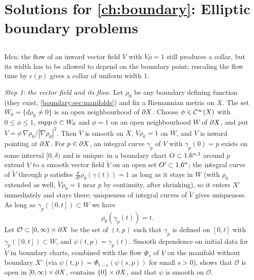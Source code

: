 \providecommand{\dCmI}{\dot{\mathcal{C}}^{-\infty}}
\providecommand{\Hdot}[1]{\dot{H}^{#1}}
\providecommand{\Xt}{\tilde{X}}
\providecommand{\PiC}{\Pi_{\mathcal{C}}}
\providecommand{\Cau}{\mathfrak{C}}

\section{Solutions for \cref{ch:boundary}: Elliptic boundary problems}\label{solutions:boundary}

\subsection*{}
Idea: the flow of an inward vector field $V$ with $V\rho=1$ still produces a collar, but
its width has to be allowed to depend on the boundary point; rescaling the flow time by
$\epsilon(p)$ gives a collar of uniform width $1$.

\emph{Step 1: the vector field and its flow.} Let $\rho_0$ be any boundary defining
function (they exist, \cref{boundary:sec:manifolds}) and fix a Riemannian metric on $X$.
The set $W_0=\{d\rho_0\neq0\}$ is an open neighbourhood of $\partial X$. Choose $\phi\in\mathcal{C}^\infty(X)$
with $0\le\phi\le1$, $\operatorname{supp}\phi\subset W_0$ and $\phi=1$ on an open neighbourhood $W$ of
$\partial X$, and put $V=\phi\,\nabla\rho_0/|\nabla\rho_0|^2$. Then $V$ is smooth on $X$,
$V\rho_0=1$ on $W$, and $V$ is inward pointing at $\partial X$. For $p\in\partial X$, an integral
curve $\gamma_p$ of $V$ with $\gamma_p(0)=p$ exists on some interval $[0,\delta)$ and is
unique: in a boundary chart $O\subset1.6^{n,1}$ around $p$ extend $V$ to a smooth vector
field $\tilde V$ on an open set $O'\subset1.6^n$; the integral curve of $\tilde V$ through
$p$ satisfies $\frac d{dt}\rho_0(\gamma(t))=1$ as long as it stays in $W$ (with $\rho_0$
extended as well, $\tilde V\tilde\rho_0=1$ near $p$ by continuity, after shrinking), so
it enters $X^\circ$ immediately and stays there; uniqueness of integral curves of
$\tilde V$ gives uniqueness. As long as $\gamma_p([0,t])\subset W$ we have
\begin{equation*}
\rho_0(\gamma_p(t))=t .
\end{equation*}
Let $\mathcal O\subset[0,\infty)\times\partial X$ be the set of $(t,p)$ such that $\gamma_p$
is defined on $[0,t]$ with $\gamma_p([0,t])\subset W$, and $\psi(t,p)=\gamma_p(t)$.
Smooth dependence on initial data for $\tilde V$ in boundary charts, combined with the
flow $\Phi_s$ of $V$ on the manifold without boundary $X^\circ$ (via
$\psi(t,p)=\Phi_{t-s}(\psi(s,p))$ for small $s>0$), shows that $\mathcal O$ is open in
$[0,\infty)\times\partial X$, contains $\{0\}\times\partial X$, and that $\psi$ is smooth on
$\mathcal O$.

